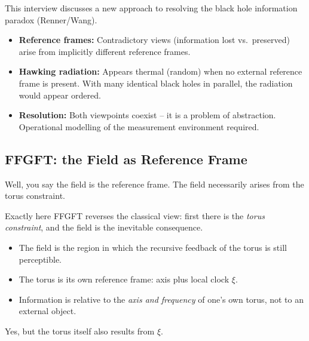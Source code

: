 \begin{geminibox}
This interview discusses a new approach to resolving the black hole information paradox (Renner/Wang).

\begin{itemize}[leftmargin=1.2em]
  \item \textbf{Reference frames:} Contradictory views (information lost vs.\ preserved) arise from implicitly different reference frames.
  \item \textbf{Hawking radiation:} Appears thermal (random) when no external reference frame is present. With many identical black holes in parallel, the radiation would appear ordered.
  \item \textbf{Resolution:} Both viewpoints coexist -- it is a problem of abstraction. Operational modelling of the measurement environment required.
\end{itemize}
\end{geminibox}

\subsection{FFGFT: the Field as Reference Frame}

\begin{userbox}
Well, you say the field is the reference frame. The field necessarily arises from the torus constraint.
\end{userbox}

\begin{geminibox}
Exactly here FFGFT reverses the classical view: first there is the \emph{torus constraint}, and the field is the inevitable consequence.

\begin{itemize}[leftmargin=1.2em]
  \item The field is the region in which the recursive feedback of the torus is still perceptible.
  \item The torus is its own reference frame: axis plus local clock $\xi$.
  \item Information is relative to the \emph{axis and frequency} of one's own torus, not to an external object.
\end{itemize}
\end{geminibox}

\begin{userbox}
Yes, but the torus itself also results from $\xi$.
\end{userbox}

